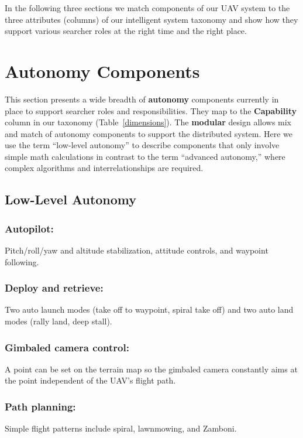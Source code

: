 In the following three sections we match components of our UAV system to the three attributes (columns) of our intelligent system taxonomy and show how they support various searcher roles at the right time and the right place.



\section{Autonomy Components}

This section presents a wide breadth of \textbf{autonomy} components currently in place to support searcher roles and responsibilities. They map to the \textbf{Capability} column in our taxonomy (Table~\ref{dimensions}). The \textbf{modular} design allows mix and match of autonomy components to support the distributed system. Here we use the term ``low-level autonomy'' to describe components that only involve simple math calculations in contrast to the term ``advanced autonomy,'' where complex algorithms and interrelationships are required.

\subsection{Low-Level Autonomy}

\subsubsection{Autopilot:} Pitch/roll/yaw and altitude stabilization, attitude controls, and waypoint following.
\subsubsection{Deploy and retrieve:} Two auto launch modes (take off to waypoint, spiral take off) and two auto land modes (rally land, deep stall).
\subsubsection{Gimbaled camera control:} A point can be set on the terrain map so the gimbaled camera constantly aims at the point independent of the UAV's flight path.
\subsubsection{Path planning:} Simple flight patterns include spiral, lawnmowing, and Zamboni.
